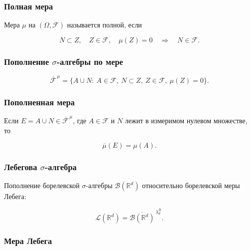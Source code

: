 \documentclass[
  11pt,
  a4paper,
]{article}
\begin{document}
\subsubsection{Полная
мера}\label{ux43fux43eux43bux43dux430ux44f-ux43cux435ux440ux430}

Мера \(\mu\) на \((\Omega,\mathcal F)\) называется полной, если

\[
N\subset Z,\quad Z\in\mathcal F,\quad \mu(Z)=0
\quad\Longrightarrow\quad
N\in\mathcal F.
\]

\subsubsection{\texorpdfstring{Пополнение \(\sigma\)-алгебры по
мере}{Пополнение \textbackslash sigma-алгебры по мере}}\label{ux43fux43eux43fux43eux43bux43dux435ux43dux438ux435-sigma-ux430ux43bux433ux435ux431ux440ux44b-ux43fux43e-ux43cux435ux440ux435}

\[
\overline{\mathcal F}^{\,\mu}
=
\{A\cup N:\ A\in\mathcal F,\ N\subset Z,\ Z\in\mathcal F,\ \mu(Z)=0\}.
\]

\subsubsection{Пополненная
мера}\label{ux43fux43eux43fux43eux43bux43dux435ux43dux43dux430ux44f-ux43cux435ux440ux430}

Если \(E=A\cup N\in\overline{\mathcal F}^{\,\mu}\), где
\(A\in\mathcal F\) и \(N\) лежит в измеримом нулевом множестве, то

\[
\overline{\mu}(E)=\mu(A).
\]

\subsubsection{\texorpdfstring{Лебегова
\(\sigma\)-алгебра}{Лебегова \textbackslash sigma-алгебра}}\label{ux43bux435ux431ux435ux433ux43eux432ux430-sigma-ux430ux43bux433ux435ux431ux440ux430}

Пополнение борелевской \(\sigma\)-алгебры \(\mathcal B(\mathbb R^d)\)
относительно борелевской меры Лебега:

\[
\mathcal L(\mathbb R^d)
=
\overline{\mathcal B(\mathbb R^d)}^{\,\lambda_d^B}.
\]

\subsubsection{Мера
Лебега}\label{ux43cux435ux440ux430-ux43bux435ux431ux435ux433ux430}
\end{document}
